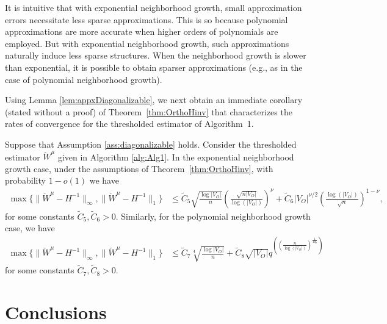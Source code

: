 \documentclass[opre,nonblindrev]{informs3} %
\begin{document}
It is intuitive that with exponential neighborhood growth, small approximation errors necessitate less sparse approximations. This is so because polynomial approximations are more accurate when higher orders of polynomials are employed. But with exponential neighborhood growth, such approximations naturally induce less sparse structures.
When the neighborhood growth is slower than exponential, it is possible to obtain sparser approximations (e.g., as in the case of polynomial neighborhood growth).


Using Lemma \ref{lem:appxDiagonalizable},
we next obtain an immediate corollary (stated without a proof) of
Theorem~\ref{thm:OrthoHinv} 
that characterizes the rates of convergence for the thresholded estimator of
Algorithm~1.

\begin{corollary} \label{cor:diagDecay}
	Suppose that
	Assumption \ref{ass:diagonalizable}  holds.
	Consider the thresholded
	estimator
	$\check W^\mu$ 
	given  in 
	Algorithm \ref{alg:Alg1}.
In the exponential neighborhood growth case,
under the assumptions of Theorem~\ref{thm:OrthoHinv}, with probability $1-o(1)$
	we have
	\begin{equation*}
	\begin{aligned}
	\max\{ \| \check W^\mu-H^{-1}\|_\infty  , \|
	\check W^\mu-H^{-1}
	\|_1 \}
	&\leq
	\tilde{C}_5
	\sqrt{\frac{\log |V_O|}{n} }
	\left(\frac{ \sqrt{n|V_O|}}{\log(|V_O|)} \right)^{\nu}
+	\tilde{C}_6
	{|V_O|}^{\nu/2}
	\left( \frac{\log(|V_O|)}{\sqrt{n} } \right)^{1-\nu},	
	\end{aligned}
	\end{equation*}
	for some constants $\tilde{C}_5,\tilde{C}_6 >0$.	
	Similarly, for the polynomial neighborhood growth case, we have
	\begin{equation*}
	\begin{aligned}
	\max\{ \| \check W^\mu-H^{-1}\|_\infty  , \|
	\check W^\mu-H^{-1}
	\|_1 \}
	&\leq
\tilde{C}_7	\sqrt[4]{\frac{\log |V_O|}{n} } 
+\tilde{C}_8
	{\sqrt{|V_O|}}
	q^{ \left({ {\left(\frac{n}{\log(|V_O|)}\right)^{\frac{1}{4d_p}}} } \right)}
	\end{aligned}
	\end{equation*}
		for some constants $\tilde{C}_7, \tilde{C}_8>0$.
\end{corollary}
 




\section{Conclusions} \label{se:conclusions}
\end{document}
